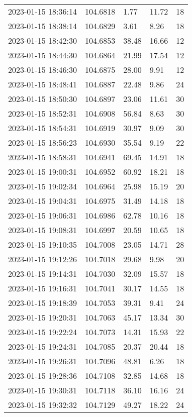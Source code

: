 \documentclass{nature_plusfigure}
\begin{document}
\begin{supplement}
\begin{center}
\begin{longtable}{lllll}
2023-01-15 18:36:14 & 104.6818 & 1.77 & 11.72 & 18 \\ 
2023-01-15 18:38:14 & 104.6829 & 3.61 & 8.26 & 18 \\ 
2023-01-15 18:42:30 & 104.6853 & 38.48 & 16.66 & 12 \\ 
2023-01-15 18:44:30 & 104.6864 & 21.99 & 17.54 & 12 \\ 
2023-01-15 18:46:30 & 104.6875 & 28.00 & 9.91 & 12 \\ 
2023-01-15 18:48:41 & 104.6887 & 22.48 & 9.86 & 24 \\ 
2023-01-15 18:50:30 & 104.6897 & 23.06 & 11.61 & 30 \\ 
2023-01-15 18:52:31 & 104.6908 & 56.84 & 8.63 & 30 \\ 
2023-01-15 18:54:31 & 104.6919 & 30.97 & 9.09 & 30 \\ 
2023-01-15 18:56:23 & 104.6930 & 35.54 & 9.19 & 22 \\ 
2023-01-15 18:58:31 & 104.6941 & 69.45 & 14.91 & 18 \\ 
2023-01-15 19:00:31 & 104.6952 & 60.92 & 18.21 & 18 \\ 
2023-01-15 19:02:34 & 104.6964 & 25.98 & 15.19 & 20 \\ 
2023-01-15 19:04:31 & 104.6975 & 31.49 & 14.18 & 18 \\ 
2023-01-15 19:06:31 & 104.6986 & 62.78 & 10.16 & 18 \\ 
2023-01-15 19:08:31 & 104.6997 & 20.59 & 10.65 & 18 \\ 
2023-01-15 19:10:35 & 104.7008 & 23.05 & 14.71 & 28 \\ 
2023-01-15 19:12:26 & 104.7018 & 29.68 & 9.98 & 20 \\ 
2023-01-15 19:14:31 & 104.7030 & 32.09 & 15.57 & 18 \\ 
2023-01-15 19:16:31 & 104.7041 & 30.17 & 14.55 & 18 \\ 
2023-01-15 19:18:39 & 104.7053 & 39.31 & 9.41 & 24 \\ 
2023-01-15 19:20:31 & 104.7063 & 45.17 & 13.34 & 30 \\ 
2023-01-15 19:22:24 & 104.7073 & 14.31 & 15.93 & 22 \\ 
2023-01-15 19:24:31 & 104.7085 & 20.37 & 20.44 & 18 \\ 
2023-01-15 19:26:31 & 104.7096 & 48.81 & 6.26 & 18 \\ 
2023-01-15 19:28:36 & 104.7108 & 32.85 & 14.68 & 18 \\ 
2023-01-15 19:30:31 & 104.7118 & 36.10 & 16.16 & 24 \\ 
2023-01-15 19:32:32 & 104.7129 & 49.27 & 18.22 & 24 \\ 

\end{longtable}
\end{center}
\end{supplement}
\end{document}
